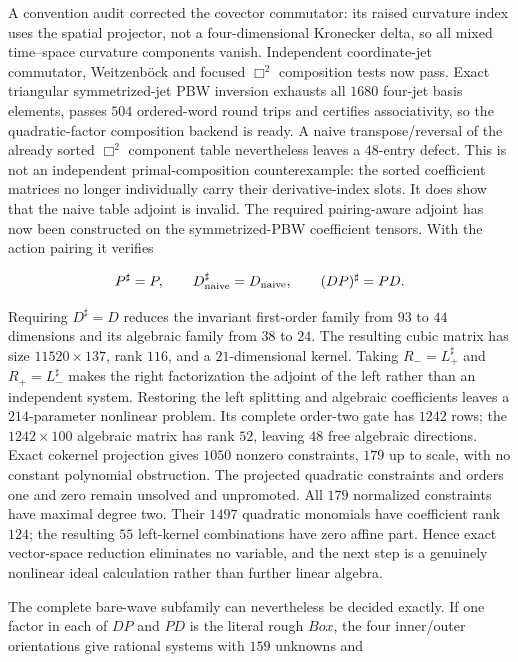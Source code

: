 \documentclass[11pt]{article}
\theoremstyle{definition}
\theoremstyle{remark}
\begin{document}
A convention audit corrected the covector commutator: its raised curvature
index uses the spatial projector, not a four-dimensional Kronecker delta, so
all mixed time--space curvature components vanish.  Independent
coordinate-jet commutator, Weitzenb\"ock and focused $\Box^2$ composition
tests now pass.  Exact triangular symmetrized-jet PBW inversion exhausts all
$1680$ four-jet basis elements, passes $504$ ordered-word round trips and
certifies associativity, so the quadratic-factor composition backend is
ready.  A naive transpose/reversal of the already sorted
$\Box^2$ component table nevertheless leaves a $48$-entry defect.  This is
not an independent primal-composition counterexample: the sorted coefficient
matrices no longer individually carry their derivative-index slots.  It does
show that the naive table adjoint is invalid.  The required pairing-aware
adjoint has now been constructed on the symmetrized-PBW coefficient tensors.
With the action pairing it verifies

\begin{equation}\label{eq:general-factor-sharp-reduction}
 P^\sharp=P,\qquad D_{\rm naive}^\sharp=D_{\rm naive},\qquad
 (DP)^\sharp=PD.
\end{equation}

Requiring $D^\sharp=D$ reduces the invariant first-order family from $93$ to
$44$ dimensions and its algebraic family from $38$ to $24$.  The resulting
cubic matrix has size $11520\times137$, rank $116$, and a $21$-dimensional
kernel.  Taking $R_-=L_+^\sharp$ and $R_+=L_-^\sharp$ makes the right
factorization the adjoint of the left rather than an independent system.
Restoring the left splitting and algebraic coefficients leaves a
$214$-parameter nonlinear problem.  Its complete order-two gate has $1242$
rows; the $1242\times100$ algebraic matrix has rank $52$, leaving $48$ free
algebraic directions.  Exact cokernel projection gives $1050$ nonzero
constraints, $179$ up to scale, with no constant polynomial obstruction.
The projected quadratic constraints and orders one and zero remain unsolved
and unpromoted.  All $179$ normalized constraints have maximal degree two.
Their $1497$ quadratic monomials have coefficient rank $124$; the resulting
$55$ left-kernel combinations have zero affine part.  Hence exact
vector-space reduction eliminates no variable, and the next step is a
genuinely nonlinear ideal calculation rather than further linear algebra.

The complete bare-wave subfamily can nevertheless be decided exactly.  If
one factor in each of $DP$ and $PD$ is the literal rough $Box$, the four
inner/outer orientations give rational systems with $159$ unknowns and
\end{document}
